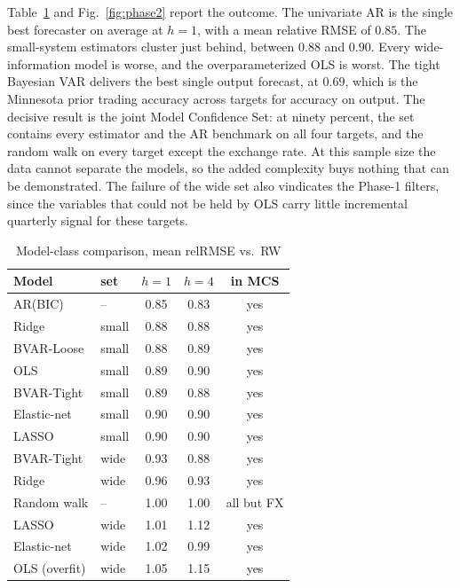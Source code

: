 \documentclass[conference]{IEEEtran}
\begin{document}
Table~\ref{tab:phase2} and Fig.~\ref{fig:phase2} report the outcome. The univariate AR is the single best forecaster on average at $h=1$, with a mean relative RMSE of $0.85$. The small-system estimators cluster just behind, between $0.88$ and $0.90$. Every wide-information model is worse, and the overparameterized OLS is worst. The tight Bayesian VAR delivers the best single output forecast, at $0.69$, which is the Minnesota prior trading accuracy across targets for accuracy on output. The decisive result is the joint Model Confidence Set: at ninety percent, the set contains every estimator and the AR benchmark on all four targets, and the random walk on every target except the exchange rate. At this sample size the data cannot separate the models, so the added complexity buys nothing that can be demonstrated. The failure of the wide set also vindicates the Phase-1 filters, since the variables that could not be held by OLS carry little incremental quarterly signal for these targets.

\begin{table}[t]
\caption{Model-class comparison, mean relRMSE vs.\ RW}
\label{tab:phase2}
\centering
\small
\begin{tabular}{@{}llccc@{}}
\toprule
Model & set & $h{=}1$ & $h{=}4$ & in MCS \\
\midrule
AR(BIC)            & --    & 0.85 & 0.83 & yes \\
Ridge              & small & 0.88 & 0.88 & yes \\
BVAR-Loose         & small & 0.88 & 0.89 & yes \\
OLS                & small & 0.89 & 0.90 & yes \\
BVAR-Tight         & small & 0.89 & 0.88 & yes \\
Elastic-net        & small & 0.90 & 0.90 & yes \\
LASSO              & small & 0.90 & 0.90 & yes \\
BVAR-Tight         & wide  & 0.93 & 0.88 & yes \\
Ridge              & wide  & 0.96 & 0.93 & yes \\
Random walk        & --    & 1.00 & 1.00 & all but FX \\
LASSO              & wide  & 1.01 & 1.12 & yes \\
Elastic-net        & wide  & 1.02 & 0.99 & yes \\
OLS (overfit)      & wide  & 1.05 & 1.15 & yes \\
\bottomrule
\end{tabular}
\end{table}
\end{document}
